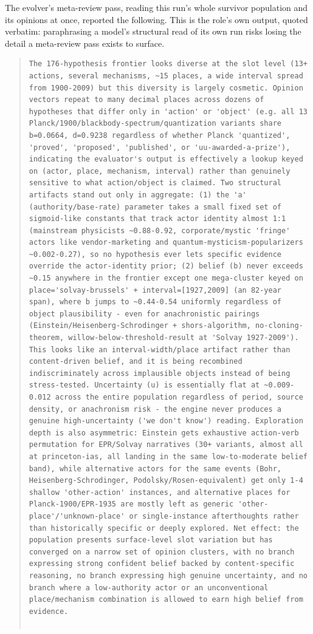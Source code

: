 \documentclass[11pt]{article}
\begin{document}
The evolver's meta-review pass, reading this run's whole survivor population and its opinions at once, reported the following. This is the role's own output, quoted verbatim: paraphrasing a model's structural read of its own run risks losing the detail a meta-review pass exists to surface.
\begin{quote}\small
\begin{verbatim}
The 176-hypothesis frontier looks diverse at the slot level (13+ actions, several mechanisms, ~15 places, a wide interval spread from 1900-2009) but this diversity is largely cosmetic. Opinion vectors repeat to many decimal places across dozens of hypotheses that differ only in 'action' or 'object' (e.g. all 13 Planck/1900/blackbody-spectrum/quantization variants share b=0.0664, d=0.9238 regardless of whether Planck 'quantized', 'proved', 'proposed', 'published', or 'uu-awarded-a-prize'), indicating the evaluator's output is effectively a lookup keyed on (actor, place, mechanism, interval) rather than genuinely sensitive to what action/object is claimed. Two structural artifacts stand out only in aggregate: (1) the 'a' (authority/base-rate) parameter takes a small fixed set of sigmoid-like constants that track actor identity almost 1:1 (mainstream physicists ~0.88-0.92, corporate/mystic 'fringe' actors like vendor-marketing and quantum-mysticism-popularizers ~0.002-0.27), so no hypothesis ever lets specific evidence override the actor-identity prior; (2) belief (b) never exceeds ~0.15 anywhere in the frontier except one mega-cluster keyed on place='solvay-brussels' + interval=[1927,2009] (an 82-year span), where b jumps to ~0.44-0.54 uniformly regardless of object plausibility - even for anachronistic pairings (Einstein/Heisenberg-Schrodinger + shors-algorithm, no-cloning-theorem, willow-below-threshold-result at 'Solvay 1927-2009'). This looks like an interval-width/place artifact rather than content-driven belief, and it is being recombined indiscriminately across implausible objects instead of being stress-tested. Uncertainty (u) is essentially flat at ~0.009-0.012 across the entire population regardless of period, source density, or anachronism risk - the engine never produces a genuine high-uncertainty ('we don't know') reading. Exploration depth is also asymmetric: Einstein gets exhaustive action-verb permutation for EPR/Solvay narratives (30+ variants, almost all at princeton-ias, all landing in the same low-to-moderate belief band), while alternative actors for the same events (Bohr, Heisenberg-Schrodinger, Podolsky/Rosen-equivalent) get only 1-4 shallow 'other-action' instances, and alternative places for Planck-1900/EPR-1935 are mostly left as generic 'other-place'/'unknown-place' or single-instance afterthoughts rather than historically specific or deeply explored. Net effect: the population presents surface-level slot variation but has converged on a narrow set of opinion clusters, with no branch expressing strong confident belief backed by content-specific reasoning, no branch expressing high genuine uncertainty, and no branch where a low-authority actor or an unconventional place/mechanism combination is allowed to earn high belief from evidence.


\end{verbatim}
\end{quote}
\end{document}
